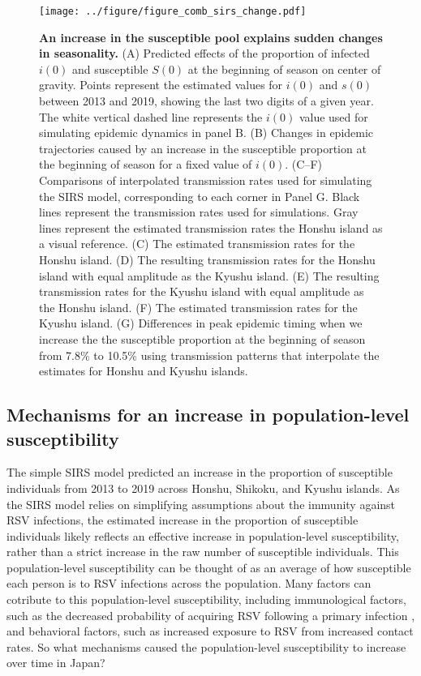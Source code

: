 \documentclass[12pt]{article}
\begin{document}
\begin{figure}[!th]
\begin{center}
\texttt{[image: ../figure/figure\_comb\_sirs\_change.pdf]}
\caption{
\textbf{An increase in the susceptible pool explains sudden changes in seasonality.}
(A) Predicted effects of the proportion of infected $i(0)$ and susceptible $S(0)$ at the beginning of season on center of gravity.
Points represent the estimated values for $i(0)$ and $s(0)$ between 2013 and 2019, showing the last two digits of a given year.
The white vertical dashed line represents the $i(0)$ value used for simulating epidemic dynamics in panel B.
(B) Changes in epidemic trajectories caused by an increase in the susceptible proportion at the beginning of season for a fixed value of $i(0)$.
(C--F) Comparisons of interpolated transmission rates used for simulating the SIRS model, corresponding to each corner in Panel G. 
Black lines represent the transmission rates used for simulations. 
Gray lines represent the estimated transmission rates the Honshu island as a visual reference.
(C) The estimated transmission rates for the Honshu island.
(D) The resulting transmission rates for the Honshu island with equal amplitude as the Kyushu island.
(E) The resulting transmission rates for the Kyushu island with equal amplitude as the Honshu island.
(F) The estimated transmission rates for the Kyushu island.
(G) Differences in peak epidemic timing when we increase the the susceptible proportion at the beginning of season from 7.8\% to 10.5\% using transmission patterns that interpolate the estimates for Honshu and Kyushu islands. 
}
\label{fig:fig3}
\end{center}
\end{figure}

\subsection*{Mechanisms for an increase in population-level susceptibility}

The simple SIRS model predicted an increase in the proportion of susceptible individuals from 2013 to 2019 across Honshu, Shikoku, and Kyushu islands.
As the SIRS model relies on simplifying assumptions about the immunity against RSV infections, the estimated increase in the proportion of susceptible individuals likely reflects an effective increase in population-level susceptibility, rather than a strict increase in the raw number of susceptible individuals.
This population-level susceptibility can be thought of as an average of how susceptible each person is to RSV infections across the population.
Many factors can cotribute to this population-level susceptibility, including immunological factors, such as the decreased probability of acquiring RSV following a primary infection \citep{pitzer2015environmental}, and behavioral factors, such as increased exposure to RSV from increased contact rates.
So what mechanisms caused the population-level susceptibility to increase over time in Japan?
\end{document}
